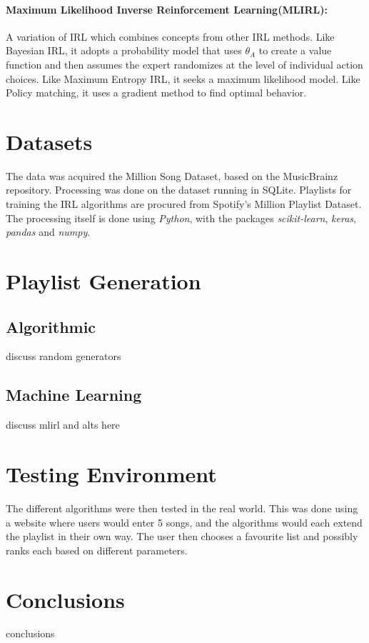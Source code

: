 \documentclass[a4paper, 12pt]{article}
\begin{document}
\paragraph*{Maximum Likelihood Inverse Reinforcement Learning(MLIRL):}
A variation of IRL which combines concepts from other IRL methods.
Like Bayesian IRL, it adopts a probability model that uses $\theta_{A}$ to create a value function and then assumes the
expert randomizes at the level of individual action choices. Like Maximum
Entropy IRL, it seeks a maximum likelihood model. Like Policy matching, it
uses a gradient method to find optimal behavior.\cite{mlirl-def}

\section{Datasets}
The data was acquired the Million Song Dataset, based on the MusicBrainz repository.
Processing was done on the dataset running in SQLite.
Playlists for training the IRL algorithms are procured from Spotify's Million Playlist Dataset.
The processing itself is done using \emph{Python}, with the packages \emph{scikit-learn}, \emph{keras}, \emph{pandas} and \emph{numpy}.

\section{Playlist Generation}
\subsection{Algorithmic}
discuss random generators
\subsection{Machine Learning}
discuss mlirl and alts here

\section{Testing Environment}
The different algorithms were then tested in the real world. This was done using a website where users would enter 5 songs,
and the algorithms would each extend the playlist in their own way. The user then chooses a favourite list and possibly ranks each based on different parameters.

\section{Conclusions}
conclusions

\printbibliography
\end{document}
